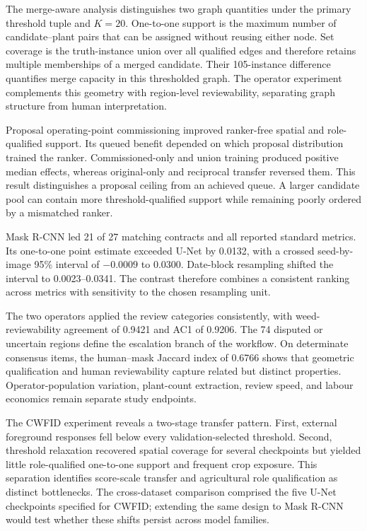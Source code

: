 \documentclass[preprint,12pt]{elsarticle}
\begin{document}
The merge-aware analysis distinguishes two graph quantities under the primary threshold tuple and $K=20$. One-to-one support is the maximum number of candidate--plant pairs that can be assigned without reusing either node. Set coverage is the truth-instance union over all qualified edges and therefore retains multiple memberships of a merged candidate. Their 105-instance difference quantifies merge capacity in this thresholded graph. The operator experiment complements this geometry with region-level reviewability, separating graph structure from human interpretation.

Proposal operating-point commissioning improved ranker-free spatial and role-qualified support. Its queued benefit depended on which proposal distribution trained the ranker. Commissioned-only and union training produced positive median effects, whereas original-only and reciprocal transfer reversed them. This result distinguishes a proposal ceiling from an achieved queue. A larger candidate pool can contain more threshold-qualified support while remaining poorly ordered by a mismatched ranker.

Mask R-CNN led 21 of 27 matching contracts and all reported standard metrics. Its one-to-one point estimate exceeded U-Net by 0.0132, with a crossed seed-by-image 95\% interval of $-0.0009$ to 0.0300. Date-block resampling shifted the interval to 0.0023--0.0341. The contrast therefore combines a consistent ranking across metrics with sensitivity to the chosen resampling unit.

The two operators applied the review categories consistently, with weed-reviewability agreement of 0.9421 and AC1 of 0.9206. The 74 disputed or uncertain regions define the escalation branch of the workflow. On determinate consensus items, the human--mask Jaccard index of 0.6766 shows that geometric qualification and human reviewability capture related but distinct properties. Operator-population variation, plant-count extraction, review speed, and labour economics remain separate study endpoints.

The CWFID experiment reveals a two-stage transfer pattern. First, external foreground responses fell below every validation-selected threshold. Second, threshold relaxation recovered spatial coverage for several checkpoints but yielded little role-qualified one-to-one support and frequent crop exposure. This separation identifies score-scale transfer and agricultural role qualification as distinct bottlenecks. The cross-dataset comparison comprised the five U-Net checkpoints specified for CWFID; extending the same design to Mask R-CNN would test whether these shifts persist across model families.
\end{document}
